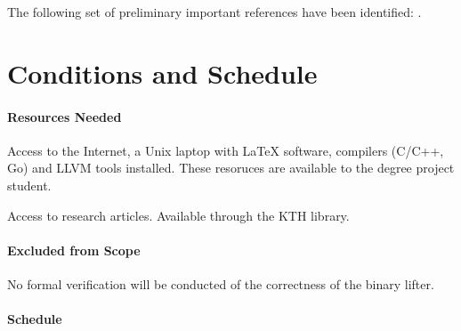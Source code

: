 \documentclass[12pt, a4paper]{article}
\begin{document}
The following set of preliminary important references have been identified: \cite{graph_based_ir,retargetable_binary_translator,dynamic_binary_translation,uqbt_binary_translator,retargetable_static_binary_translator,ssa_for_decompilation,valgrind,bitblaze,architecture_independent_binary_analysis_and_transformation,arm_analysis_using_llvm,bap,revgen,wartell_rewriting_x86_binaries,barf,singled_graph_disassembly,dbill,instruction_idiom_detection,graph_based_higher_order_ir,reconstruction_of_instruction_idioms,extracting_instruction_semantics_via_symbolic_exectuion_of_code_generators,software_transformation,state_of_the_art_of_war,function_recovery,bin2llvm,sound_transpilation_from_binary_to_ir,cast_study_llvm_suitable_for_binary_analysis,revng,evaluation_of_irs,binrec,lifter_synthesis,superset_disassembly,b2r2,llvm_ir_lifter_using_mcsema_and_dyninst,gtirb,case_for_bap_and_angr,retrowrite,refining_indirect_call_targets}.


\section{Conditions and Schedule}


\paragraph{Resources Needed}

Access to the Internet, a Unix laptop with LaTeX software, compilers (C/C++, Go) and LLVM tools installed. These resoruces are available to the degree project student.

Access to research articles. Available through the KTH library.


\paragraph{Excluded from Scope}

No formal verification will be conducted of the correctness of the binary lifter.


\paragraph{Schedule}
\end{document}
